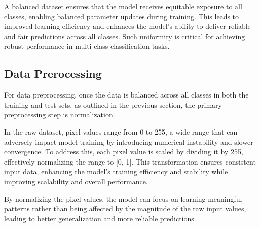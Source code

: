 A balanced dataset ensures that the model receives equitable exposure to all classes, enabling balanced parameter updates during training. This leads to improved learning efficiency and enhances the model’s ability to deliver reliable and fair predictions across all classes. Such uniformity is critical for achieving robust performance in multi-class classification tasks.

\subsection{Data Prerocessing}

For data preprocessing, once the data is balanced across all classes in both the training and test sets, as outlined in the previous section, the primary preprocessing step is normalization.

In the raw dataset, pixel values range from 0 to 255, a wide range that can adversely impact model training by introducing numerical instability and slower convergence. To address this, each pixel value is scaled by dividing it by 255, effectively normalizing the range to [0, 1]. This transformation ensures consistent input data, enhancing the model's training efficiency and stability while improving scalability and overall performance.

By normalizing the pixel values, the model can focus on learning meaningful patterns rather than being affected by the magnitude of the raw input values, leading to better generalization and more reliable predictions.